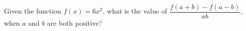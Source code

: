 Given the function $f(x)=6x^2$, what is the value of $\dfrac{f(a+b)-f(a-b)}{ab}$, when $a$ and $b$ are both positive?
